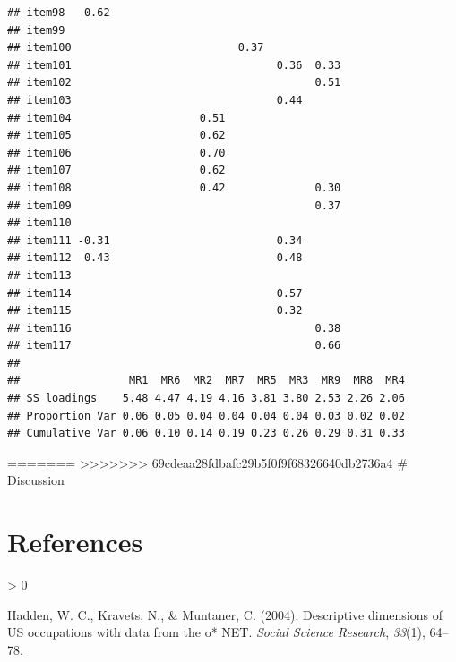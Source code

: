 \documentclass[
  english,
  man]{apa6}
\newlength{\cslhangindent}
\newenvironment{CSLReferences}[2] %
 {%
  \setlength{\parindent}{0pt}
  \ifodd #1 \everypar{\setlength{\hangindent}{\cslhangindent}}\ignorespaces\fi
  \ifnum #2 > 0
  \setlength{\parskip}{#2\baselineskip}
  \fi
 }%
 {}
\begin{document}
\begin{verbatim}
## item98   0.62                                                
## item99                                                       
## item100                          0.37                        
## item101                                0.36  0.33            
## item102                                      0.51            
## item103                                0.44                  
## item104                    0.51                              
## item105                    0.62                              
## item106                    0.70                              
## item107                    0.62                              
## item108                    0.42              0.30            
## item109                                      0.37            
## item110                                                      
## item111 -0.31                          0.34                  
## item112  0.43                          0.48                  
## item113                                                      
## item114                                0.57                  
## item115                                0.32                  
## item116                                      0.38            
## item117                                      0.66            
## 
##                 MR1  MR6  MR2  MR7  MR5  MR3  MR9  MR8  MR4
## SS loadings    5.48 4.47 4.19 4.16 3.81 3.80 2.53 2.26 2.06
## Proportion Var 0.06 0.05 0.04 0.04 0.04 0.04 0.03 0.02 0.02
## Cumulative Var 0.06 0.10 0.14 0.19 0.23 0.26 0.29 0.31 0.33
\end{verbatim}

=======
\textgreater\textgreater\textgreater\textgreater\textgreater\textgreater\textgreater{} 69cdeaa28fdbafc29b5f0f9f68326640db2736a4
\# Discussion

\newpage

\hypertarget{references}{%
\section{References}\label{references}}

\begingroup
\setlength{\parindent}{-0.5in}
\setlength{\leftskip}{0.5in}

\hypertarget{refs}{}
\begin{CSLReferences}{1}{0}
\leavevmode\hypertarget{ref-hadden2004descriptive}{}%
Hadden, W. C., Kravets, N., \& Muntaner, C. (2004). Descriptive dimensions of US occupations with data from the o* NET. \emph{Social Science Research}, \emph{33}(1), 64--78.

\end{CSLReferences}

\endgroup
\end{document}
